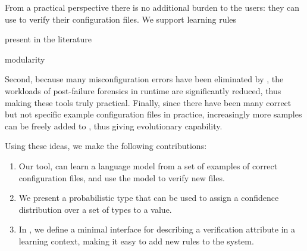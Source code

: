 From a  practical perspective there is no additional burden 
to the users: they can use \app to verify their configuration files.
We support learning rules 

present in the literature

modularity


Second, because many misconfiguration errors have been eliminated 
by \app, the workloads of post-failure forensics in runtime
are significantly reduced, thus making these tools truly practical.
Finally, since there have been many correct but not specific 
example configuration files in practice, 
increasingly more samples can be freely added to \app,
thus giving \app evolutionary capability.

Using these ideas, we make the following contributions:

\begin{enumerate}

  \item Our tool, \app can learn a language model from a set of examples of correct configuration files, and use the model to verify new files.
  \item We present a probabilistic type that can be used to assign a confidence distribution over a set of types to a value.
  \item In \app, we define a minimal interface for describing a verification attribute in a learning context, making it easy to add new rules to the system.

\end{enumerate}
